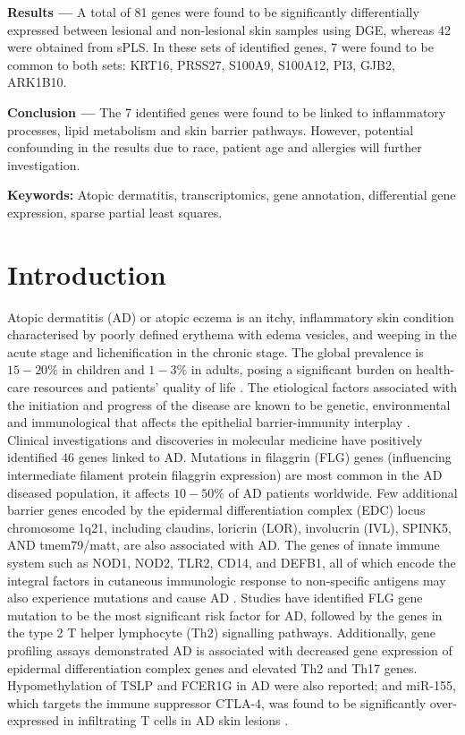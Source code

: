 \documentclass[journal, a4paper]{IEEEtran}
\begin{document}
\textbf{Results ---} A total of 81 genes were found to be significantly differentially expressed between lesional and non-lesional skin samples using DGE, whereas 42 were obtained from sPLS. In these sets of identified genes, 7 were found to be common to both sets: KRT16, PRSS27, S100A9, S100A12, PI3, GJB2, ARK1B10.

\textbf{Conclusion ---} The 7 identified genes were found to be linked to inflammatory processes, lipid metabolism and skin barrier pathways. However, potential confounding in the results due to race, patient age and allergies will further investigation. 

\textbf{Keywords:} Atopic dermatitis, transcriptomics, gene annotation, differential gene expression, sparse partial least squares.

\section{\textbf{Introduction}}

Atopic dermatitis (AD) or atopic eczema is an itchy, inflammatory skin condition characterised by poorly defined erythema with edema vesicles, and weeping in the acute stage and lichenification in the chronic stage. The global prevalence is $15-20 \%$ in children and $1-3\%$ in adults, posing a significant burden on health-care resources and patients’ quality of life \cite{nutten2015atopic}. The etiological factors associated with the initiation and progress of the disease are known to be genetic, environmental and immunological that affects the epithelial barrier-immunity interplay \cite{peng2015pathogenesis}.\\

Clinical investigations and discoveries in molecular medicine have positively identified $46$ genes linked to AD. Mutations in filaggrin (FLG) genes (influencing intermediate filament protein filaggrin expression) are most common in the AD diseased population, it affects $10-50\%$ of AD patients worldwide. Few additional barrier genes encoded by the epidermal differentiation complex (EDC) locus chromosome 1q21, including claudins, loricrin (LOR), involucrin (IVL), SPINK5, AND tmem79/matt, are also associated with AD. The genes of innate immune system such as NOD1, NOD2, TLR2, CD14, and DEFB1, all of which encode the integral factors in cutaneous immunologic response to non-specific antigens may also experience mutations and cause AD \cite{guttman2017atopic}. Studies have identified FLG gene mutation to be the most significant risk factor for AD, followed by the genes in the type 2 T helper lymphocyte (Th2) signalling pathways. Additionally, gene profiling assays demonstrated AD is associated with decreased gene expression of epidermal differentiation complex genes and elevated Th2 and Th17 genes. Hypomethylation of TSLP and FCER1G in AD were also reported; and miR-155, which targets the immune suppressor CTLA-4, was found to be significantly over-expressed in infiltrating T cells in AD skin lesions \cite{guttman2017atopic, bin2016genetic}.\\
\end{document}
